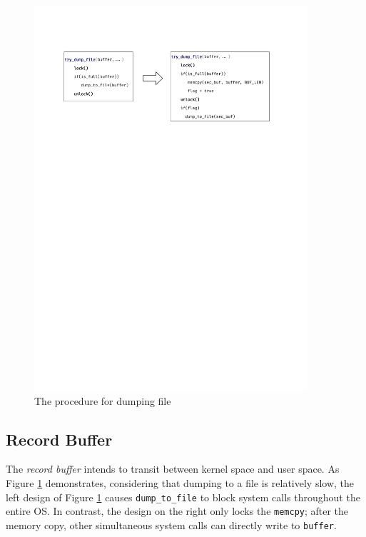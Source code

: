 \begin{figure}
    \centering
    \includegraphics[width=0.9\textwidth]{figures/dual_buf.pdf}
    \caption{The procedure for dumping file}
    \label{fig:dual_buf}
\end{figure}



\subsection{Record Buffer}

The \textit{record buffer} intends to transit between kernel space and user space. As Figure \ref{fig:dual_buf} demonstrates, considering that dumping to a file is relatively slow, the left design of Figure \ref{fig:dual_buf} causes \texttt{dump\_to\_file} to block system calls throughout the entire OS. In contrast, the design on the right only locks the \texttt{memcpy}; after the memory copy, other simultaneous system calls can directly write to \texttt{buffer}. 

